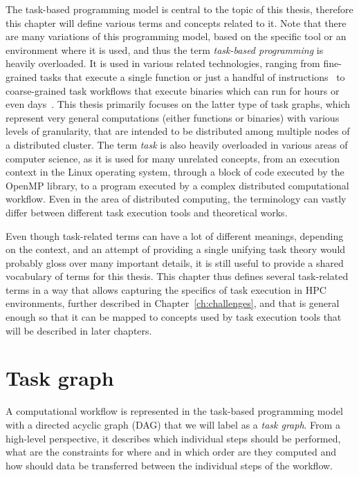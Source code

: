 
The task-based programming model is central to the topic of this thesis, therefore this chapter
will define various terms and concepts related to it. Note that there are many variations of this
programming model, based on the specific tool or an environment where it is used, and thus the term
\emph{task-based programming} is heavily overloaded. It is used in various related technologies, ranging
from fine-grained tasks that execute a single function or just a handful of
instructions~\cite{starpu,openmp} to coarse-grained task workflows that execute binaries which
can run for hours or even days~\cite{dask, snakemake, nextflow}. This thesis primarily focuses on the latter
type of task graphs, which represent very general computations (either functions or binaries) with
various levels of granularity, that are intended to be distributed among multiple nodes of a
distributed cluster. The term \emph{task} is also heavily overloaded in various areas of
computer science, as it is used for many unrelated concepts, from an execution context in the Linux
operating system, through a block of code executed by the OpenMP library, to a program executed by
a complex distributed computational workflow. Even in the area of distributed computing, the
terminology can vastly differ between different task execution tools and theoretical works.

Even though task-related terms can have a lot of different meanings, depending on the context, and
an attempt of providing a single unifying task theory would probably gloss over many important
details, it is still useful to provide a shared vocabulary of terms for this thesis. This chapter
thus defines several task-related terms in a way that allows capturing the specifics of task
execution in HPC environments, further described in Chapter~\ref{ch:challenges}, and that is
general enough so that it can be mapped to concepts used by task execution tools that will be
described in later chapters.


\section{Task graph}
A computational workflow is represented in the task-based programming model with a directed acyclic
graph (DAG) that we will label as a \emph{task graph}. From a high-level perspective, it
describes which individual steps should be performed, what are the constraints for where and in
which order are they computed and how should data be transferred between the individual steps of
the workflow.

